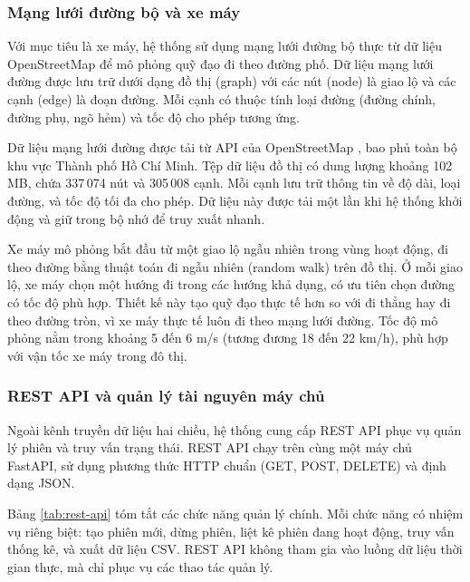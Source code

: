 \subsubsection{Mạng lưới đường bộ và xe máy}

\hspace{0.5cm} Với mục tiêu là xe máy, hệ thống sử dụng mạng lưới đường bộ thực từ dữ liệu OpenStreetMap để mô phỏng quỹ đạo đi theo đường phố. Dữ liệu mạng lưới đường được lưu trữ dưới dạng đồ thị (graph) với các nút (node) là giao lộ và các cạnh (edge) là đoạn đường. Mỗi cạnh có thuộc tính loại đường (đường chính, đường phụ, ngõ hẻm) và tốc độ cho phép tương ứng.

Dữ liệu mạng lưới đường được tải từ API của OpenStreetMap \cite{boeing2017osmnx}, bao phủ toàn bộ khu vực Thành phố Hồ Chí Minh. Tệp dữ liệu đồ thị có dung lượng khoảng 102 MB, chứa 337\,074 nút và 305\,008 cạnh. Mỗi cạnh lưu trữ thông tin về độ dài, loại đường, và tốc độ tối đa cho phép. Dữ liệu này được tải một lần khi hệ thống khởi động và giữ trong bộ nhớ để truy xuất nhanh.

Xe máy mô phỏng bắt đầu từ một giao lộ ngẫu nhiên trong vùng hoạt động, đi theo đường bằng thuật toán đi ngẫu nhiên (random walk) trên đồ thị. Ở mỗi giao lộ, xe máy chọn một hướng đi trong các hướng khả dụng, có ưu tiên chọn đường có tốc độ phù hợp. Thiết kế này tạo quỹ đạo thực tế hơn so với đi thẳng hay đi theo đường tròn, vì xe máy thực tế luôn đi theo mạng lưới đường. Tốc độ mô phỏng nằm trong khoảng 5 đến 6 m/s (tương đương 18 đến 22 km/h), phù hợp với vận tốc xe máy trong đô thị.

\subsubsection{REST API và quản lý tài nguyên máy chủ}

\hspace{0.5cm} Ngoài kênh truyền dữ liệu hai chiều, hệ thống cung cấp REST API phục vụ quản lý phiên và truy vấn trạng thái. REST API chạy trên cùng một máy chủ FastAPI, sử dụng phương thức HTTP chuẩn (GET, POST, DELETE) và định dạng JSON.

Bảng \ref{tab:rest-api} tóm tắt các chức năng quản lý chính. Mỗi chức năng có nhiệm vụ riêng biệt: tạo phiên mới, dừng phiên, liệt kê phiên đang hoạt động, truy vấn thống kê, và xuất dữ liệu CSV. REST API không tham gia vào luồng dữ liệu thời gian thực, mà chỉ phục vụ các thao tác quản lý.

